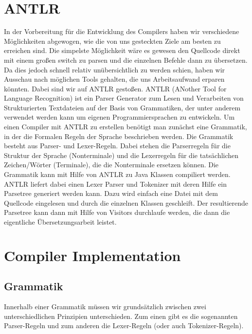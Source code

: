 \documentclass[paper=a4,fontsize=12pt]{scrreprt}
\begin{document}
\section{ANTLR}
In der Vorbereitung für die Entwicklung des Compilers haben wir verschiedene Möglichkeiten abgewogen, wie die von uns gesteckten Ziele am besten zu erreichen sind. Die simpelste Möglichkeit wäre es gewesen den Quellcode direkt mit einem großen switch zu parsen und die einzelnen Befehle dann zu übersetzen. Da dies jedoch schnell relativ unübersichtlich zu werden schien, haben wir Ausschau nach möglichen Tools gehalten, die uns Arbeitsaufwand erparen könnten. Dabei sind wir auf ANTLR gestoßen.
ANTLR (ANother Tool for Language Recognition) ist ein Parser  Generator zum Lesen und Verarbeiten von Strukturierten Textdateien auf der Basis von Grammatiken, der unter anderem verwendet werden kann um eigenen Programmiersprachen zu entwickeln.
Um einen Compiler mit ANTLR zu erstellen benötigt man zunächst eine Grammatik, in der die Formalen Regeln der Sprache beschrieben werden. Die Grammatik besteht aus Parser- und Lexer-Regeln. Dabei stehen die Parserregeln für die Struktur der Sprache (Nonterminale) und die Lexerregeln für die tatsächlichen Zeichen/Wörter (Terminale), die die Nonterminale ersetzen können. 
Die Grammatik kann mit Hilfe von ANTLR zu Java Klassen compiliert werden. ANTLR liefert dabei einen Lexer Parser und Tokenizer mit deren Hilfe ein Parsetree generiert werden kann. Dazu wird einfach eine Datei mit dem Quellcode eingelesen und durch die einzelnen Klassen geschleift. Der resultierende Parsetree kann dann mit Hilfe von Visitors durchlaufe werden, die dann die eigentliche Übersetzungsarbeit leistet.



\section{Compiler Implementation}
\subsection{Grammatik}
Innerhalb einer Grammatik müssen wir grundsätzlich zwischen zwei unterschiedlichen Prinzipien unterschieden. Zum einen gibt es die sogenannten Parser-Regeln und zum anderen die Lexer-Regeln (oder auch Tokenizer-Regeln). 
\end{document}
